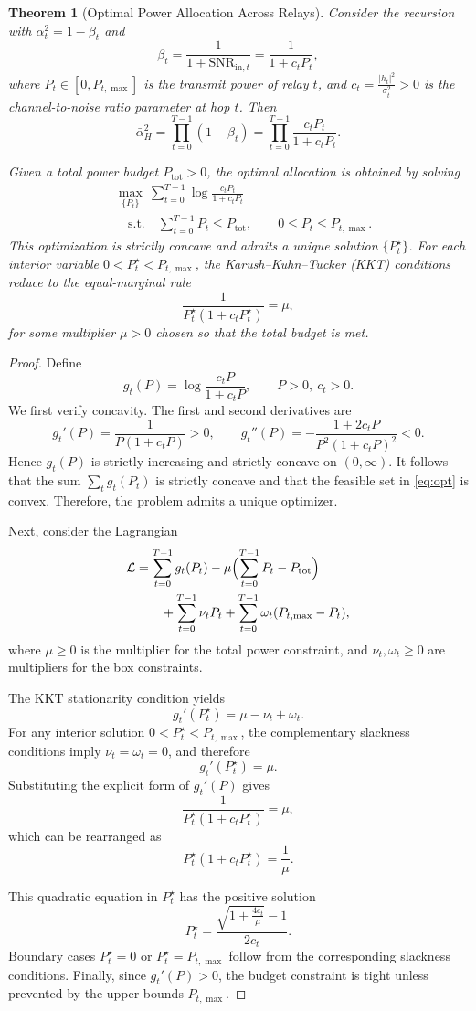 \documentclass[10pt,a4paper]{amsart}
\newtheorem{theorem}{Theorem}
\begin{document}
\begin{theorem}[Optimal Power Allocation Across Relays]\label{thm:equalization}
Consider the recursion with $\alpha_t^2 = 1-\beta_t$ and
\[
\beta_t = \frac{1}{1+\mathrm{SNR}_{\mathrm{in},t}}
= \frac{1}{1+c_t P_t}, 
\]
where $P_t\in[0,P_{t,\max}]$ is the transmit power of relay $t$, 
and $c_t=\frac{|h_t|^2}{\sigma_t^2}>0$ is the channel-to-noise ratio parameter at hop $t$. 
Then
\[
\bar\alpha_H^2=\prod_{t=0}^{T-1}(1-\beta_t)
=\prod_{t=0}^{T-1}\frac{c_tP_t}{1+c_tP_t}.
\]

Given a total power budget $P_{\mathrm{tot}}>0$, the optimal allocation is obtained by solving
\begin{align}\label{eq:opt}
&\max_{\{P_t\}}\ \sum_{t=0}^{T-1}\log\frac{c_tP_t}{1+c_tP_t}\\
&\quad \text{s.t.}\quad
\sum_{t=0}^{T-1} P_t \le P_{\mathrm{tot}},\qquad 
0 \le P_t \le P_{t,\max}.
\nonumber
\end{align}
This optimization is strictly concave and admits a unique solution $\{P_t^\star\}$. 
For each interior variable $0<P_t^\star<P_{t,\max}$, the Karush--Kuhn--Tucker (KKT) 
conditions reduce to the equal-marginal rule
\[
\frac{1}{P_t^\star(1+c_tP_t^\star)}=\mu,
\]
for some multiplier $\mu>0$ chosen so that the total budget is met. 
\end{theorem}

\begin{proof}
Define
\[
g_t(P) = \log\frac{c_tP}{1+c_tP}, \qquad P>0,\ c_t>0.
\]
We first verify concavity. The first and second derivatives are
\[
g_t'(P) = \frac{1}{P(1+c_tP)} > 0, \qquad
g_t''(P) = -\frac{1+2c_tP}{P^2(1+c_tP)^2} < 0.
\]
Hence $g_t(P)$ is strictly increasing and strictly concave on $(0,\infty)$. 
It follows that the sum $\sum_t g_t(P_t)$ is strictly concave and that 
the feasible set in \eqref{eq:opt} is convex. Therefore, the problem admits 
a unique optimizer.

Next, consider the Lagrangian
\[
\begin{aligned}
\mathcal{L} &= \sum_{t=0}^{T-1} g_t(P_t) 
- \mu\Bigl(\sum_{t=0}^{T-1} P_t - P_{\mathrm{tot}}\Bigr)\\
&\qquad+ \sum_{t=0}^{T-1} \nu_t P_t 
+ \sum_{t=0}^{T-1} \omega_t (P_{t,\max}-P_t),
\end{aligned}
\]
where $\mu\ge0$ is the multiplier for the total power constraint, 
and $\nu_t,\omega_t\ge0$ are multipliers for the box constraints.

The KKT stationarity condition yields
\[
g_t'(P_t^\star) = \mu - \nu_t + \omega_t.
\]
For any interior solution $0<P_t^\star<P_{t,\max}$, the complementary slackness 
conditions imply $\nu_t=\omega_t=0$, and therefore
\[
g_t'(P_t^\star) = \mu.
\]
Substituting the explicit form of $g_t'(P)$ gives
\[
\frac{1}{P_t^\star(1+c_tP_t^\star)} = \mu,
\]
which can be rearranged as
\[
P_t^\star(1+c_tP_t^\star) = \frac{1}{\mu}.
\]

This quadratic equation in $P_t^\star$ has the positive solution
\[
P_t^\star = \frac{\sqrt{1+\tfrac{4c_t}{\mu}}-1}{2c_t}.
\]
Boundary cases $P_t^\star=0$ or $P_t^\star=P_{t,\max}$ follow from the 
corresponding slackness conditions. Finally, since $g_t'(P)>0$, the 
budget constraint is tight unless prevented by the upper bounds 
$P_{t,\max}$. 
\end{proof}
\end{document}
